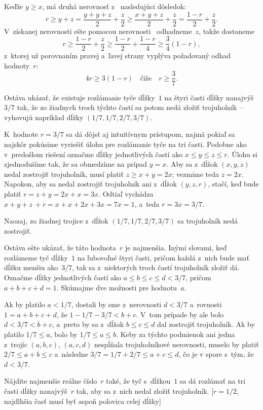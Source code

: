 {Keďže $y \ge x$, má druhá nerovnosť z~ nasledujúci dôsledok:
$$
r \ge y+z = \frac{y+y+z}{2}+\frac z2\ge
\frac{x+y+z}{2}+\frac z2 = \frac {1-r}2 +\frac z2.
$$
V~získanej nerovnosti ešte pomocou nerovnosti~
odhadneme~$z$, takže dostaneme
$$
r\ge \frac {1-r}2 +\frac z2 \ge \frac{1-r}2 + \frac{1-r}4\ge \frac34(1-r),
$$
z~ktorej už porovnaním pravej a~ľavej strany vyplýva požadovaný odhad
hodnoty~$r$:
$$
4r\ge 3(1-r) \quad\text{čiže}\quad
r \ge \frac 37.
$$

Ostáva ukázať, že existuje rozlámanie tyče dĺžky~$1$ na štyri časti
dĺžky nanajvýš $3/7$ tak, že zo žiadnych troch týchto častí sa potom nedá
zložiť trojuholník~-- vyhovujú napríklad dĺžky $(1/7, 1/7, 2/7, 3/7)$.

\ineriesenie
K~hodnote $r = 3/7$ sa dá dôjsť aj intuitívnym prístupom, najmä pokiaľ
sa najskôr pokúsime vyriešiť úlohu pre rozlámanie tyče na tri časti.
Podobne ako v~predošlom riešení označme dĺžky jednotlivých častí
ako $x \le y \le z\le r$. Úlohu si zjednodušíme tak, že sa obmedzíme na
prípad $y = x$. Aby sa z~dĺžok $(x, y, z)$ nedal zostrojiť
trojuholník, musí platiť $z \ge x + y = 2x$; vezmime teda $z = 2x$. Napokon,
aby sa nedal zostrojiť trojuholník ani z~dĺžok $(y, z, r)$, stačí, keď bude platiť $r=
z+ y = 2x + x = 3x$. Odtiaľ vychádza $x + y + z~+ r = x + x +2x +3x = 7x = 1$,
a~teda $r = 3x = 3/7$.

Naozaj, zo žiadnej trojice z~dĺžok $(1/7, 1/7, 2/7, 3/7)$ sa trojuholník nedá zostrojiť.

Ostáva ešte ukázať, že táto hodnota~$r$ je najmenšia. Inými slovami,
keď rozlámeme tyč dĺžky~$1$ na ľubovoľné štyri časti, pričom
každá z~nich bude mať dĺžku menšiu ako~$3/7$, tak sa z~niektorých troch
častí trojuholník zložiť dá. Označme dĺžky jednotlivých
častí ako $a \le b \le c \le d < 3/7$, pričom $a + b + c + d = 1$. Skúmajme dve
možnosti pre hodnotu~$a$.

Ak by platilo $a < 1/7$, dostali by sme z~nerovnosti $d < 3/7$
a~rovnosti $1 ={a+ b + c + d}$, že $1-1/7-3/7 < b + c$. V~tom prípade by ale bolo
$d < 3/7 < b + c$, a~preto by sa z~dĺžok $b \le c \le d$ dal zostrojiť trojuholník.
Ak by platilo $1/7 \le a$, bolo by $1/7 \le a\le b$.
Keby za týchto podmienok ani jedna z~trojíc $(a, b, c)$, $(a, c, d)$
nespĺňala trojuholníkové nerovnosti,
muselo by platiť $2/7 \le a+ b \le c$ a~následne $3/7 = 1/7 +2/7 \le a+ c \le d$,
čo je v spore s~tým, že $d < 3/7$.

Nájdite najmenšie reálne číslo~$r$ také, že tyč s~dĺžkou~$1$ sa dá
rozlámať na tri časti dĺžky nanajvýš~$r$ tak, aby sa z~nich nedal
zložiť trojuholník.
[$r = 1/2$, najdlhšia časť musí byť aspoň polovica celej dĺžky]

}
